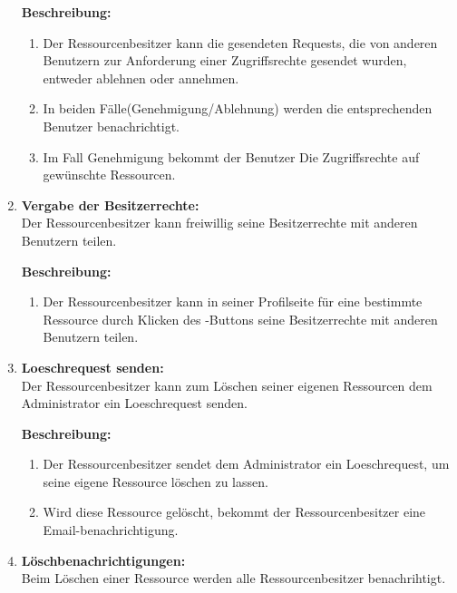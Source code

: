 \documentclass[parskip=full,11pt]{scrartcl}
\def\threedigits#1{%
  \ifnum#1<10 0\fi
  \ifnum#1<1 0\fi
  \number#1}
\begin{document}
\begin{enumerate}[label={\textbf{/F\protect\threedigits{\theenumi}0/}}, leftmargin=*, resume]
\textbf{Beschreibung:}\\
\begin{enumerate}[label=(\arabic*), leftmargin=*]

\item Der Ressourcenbesitzer kann die gesendeten Requests, die von anderen Benutzern zur Anforderung einer Zugriffsrechte gesendet wurden, entweder ablehnen oder annehmen.
\item In beiden Fälle(Genehmigung/Ablehnung) werden die entsprechenden Benutzer benachrichtigt.
\item Im Fall Genehmigung bekommt der Benutzer Die Zugriffsrechte auf  gewünschte Ressourcen.
\end{enumerate}

\item \label{FARB5} \textbf{Vergabe der Besitzerrechte:}\\
Der Ressourcenbesitzer kann freiwillig seine Besitzerrechte mit anderen Benutzern teilen.

\textbf{Beschreibung:}\\
\begin{enumerate}[label=(\arabic*), leftmargin=*]

\item Der Ressourcenbesitzer kann in seiner Profilseite für eine bestimmte Ressource durch Klicken des \grqq -Buttons seine Besitzerrechte mit anderen Benutzern teilen.
\end{enumerate}
\item \label{FARB6} \textbf{Loeschrequest senden:}\\
Der Ressourcenbesitzer kann zum Löschen seiner eigenen Ressourcen dem Administrator ein Loeschrequest senden.

\textbf{Beschreibung:}\\
\begin{enumerate}[label=(\arabic*), leftmargin=*]
\item Der Ressourcenbesitzer sendet dem Administrator ein Loeschrequest, um seine eigene Ressource löschen zu lassen.
\item Wird diese Ressource gelöscht, bekommt der Ressourcenbesitzer eine Email-benachrichtigung.
\end{enumerate}
\item \label{FARB7} \colorbox{shadecolor} {\textbf{Löschbenachrichtigungen:}}\\
Beim Löschen einer Ressource werden alle Ressourcenbesitzer benachrihtigt.\\\


\end{enumerate}
\end{document}
